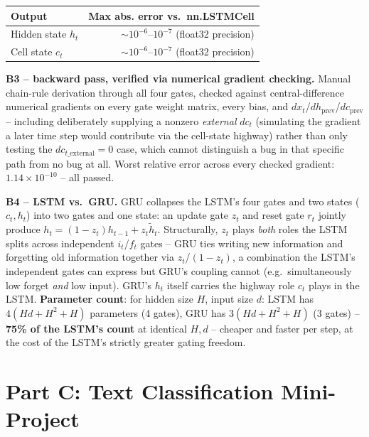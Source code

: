 \documentclass[11pt,a4paper]{article}
\begin{document}
\begin{table}[H]
\centering
\begin{tabular}{lr}
\toprule
\textbf{Output} & \textbf{Max abs. error vs.\ nn.LSTMCell} \\
\midrule
Hidden state $h_t$ & $\sim10^{-6}$--$10^{-7}$ (float32 precision) \\
Cell state $c_t$ & $\sim10^{-6}$--$10^{-7}$ (float32 precision) \\
\bottomrule
\end{tabular}
\end{table}

\textbf{B3 -- backward pass, verified via numerical gradient checking.} Manual chain-rule
derivation through all four gates, checked against central-difference numerical gradients on
every gate weight matrix, every bias, and $dx_t$/$dh_{\text{prev}}$/$dc_{\text{prev}}$ --
including deliberately supplying a nonzero \emph{external} $dc_t$ (simulating the gradient a
later time step would contribute via the cell-state highway) rather than only testing the
$dc_{t\_\text{external}}{=}0$ case, which cannot distinguish a bug in that specific path from
no bug at all. Worst relative error across every checked gradient:
\textbf{$1.14\times10^{-10}$} -- all passed.

\textbf{B4 -- LSTM vs.\ GRU.} GRU collapses the LSTM's four gates and two states ($c_t,h_t$)
into two gates and one state: an update gate $z_t$ and reset gate $r_t$ jointly produce
$h_t = (1-z_t)h_{t-1} + z_t \tilde h_t$. Structurally, $z_t$ plays \emph{both} roles the LSTM
splits across independent $i_t$/$f_t$ gates -- GRU ties writing new information and
forgetting old information together via $z_t$/$(1-z_t)$, a combination the LSTM's
independent gates can express but GRU's coupling cannot (e.g.\ simultaneously low forget
\emph{and} low input). GRU's $h_t$ itself carries the highway role $c_t$ plays in the LSTM.
\textbf{Parameter count}: for hidden size $H$, input size $d$: LSTM has
$4(Hd + H^2 + H)$ parameters (4 gates), GRU has $3(Hd+H^2+H)$ (3 gates) -- \textbf{75\% of
the LSTM's count} at identical $H,d$ -- cheaper and faster per step, at the cost of the
LSTM's strictly greater gating freedom.

\section*{Part C: Text Classification Mini-Project}
\end{document}
